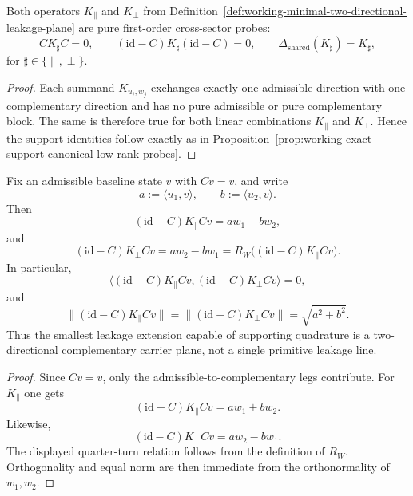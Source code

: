 \begin{proposition}
\label{prop:working-exact-support-minimal-two-directional-class}
Both operators $K_{\parallel}$ and $K_{\perp}$ from Definition~\ref{def:working-minimal-two-directional-leakage-plane} are pure first-order cross-sector probes:
\[
  CK_{\sharp}C=0,
  \qquad
  (\mathrm{id}-C)K_{\sharp}(\mathrm{id}-C)=0,
  \qquad
  \Delta_{\mathrm{shared}}(K_{\sharp})=K_{\sharp},
\]
for $\sharp\in\{\parallel,\perp\}$.
\end{proposition}

\begin{proof}
Each summand $K_{u_i,w_j}$ exchanges exactly one admissible direction with one complementary direction and has no pure admissible or pure complementary block. The same is therefore true for both linear combinations $K_{\parallel}$ and $K_{\perp}$. Hence the support identities follow exactly as in Proposition~\ref{prop:working-exact-support-canonical-low-rank-probes}.
\end{proof}

\begin{proposition}
\label{prop:working-complementary-output-geometry-minimal-two-directional-class}
Fix an admissible baseline state $v$ with $Cv=v$, and write
\[
  a:=\langle u_1,v\rangle,
  \qquad
  b:=\langle u_2,v\rangle.
\]
Then
\[
  (\mathrm{id}-C)K_{\parallel}Cv = a w_1 + b w_2,
\]
and
\[
  (\mathrm{id}-C)K_{\perp}Cv = a w_2 - b w_1 = R_W\bigl((\mathrm{id}-C)K_{\parallel}Cv\bigr).
\]
In particular,
\[
  \bigl\langle (\mathrm{id}-C)K_{\parallel}Cv,(\mathrm{id}-C)K_{\perp}Cv\bigr\rangle = 0,
\]
and
\[
  \bigl\|(\mathrm{id}-C)K_{\parallel}Cv\bigr\| = \bigl\|(\mathrm{id}-C)K_{\perp}Cv\bigr\| = \sqrt{a^2+b^2}.
\]
Thus the smallest leakage extension capable of supporting quadrature is a two-directional complementary carrier plane, not a single primitive leakage line.
\end{proposition}

\begin{proof}
Since $Cv=v$, only the admissible-to-complementary legs contribute. For $K_{\parallel}$ one gets
\[
  (\mathrm{id}-C)K_{\parallel}Cv = a w_1 + b w_2.
\]
Likewise,
\[
  (\mathrm{id}-C)K_{\perp}Cv = a w_2 - b w_1.
\]
The displayed quarter-turn relation follows from the definition of $R_W$. Orthogonality and equal norm are then immediate from the orthonormality of $w_1,w_2$.
\end{proof}

